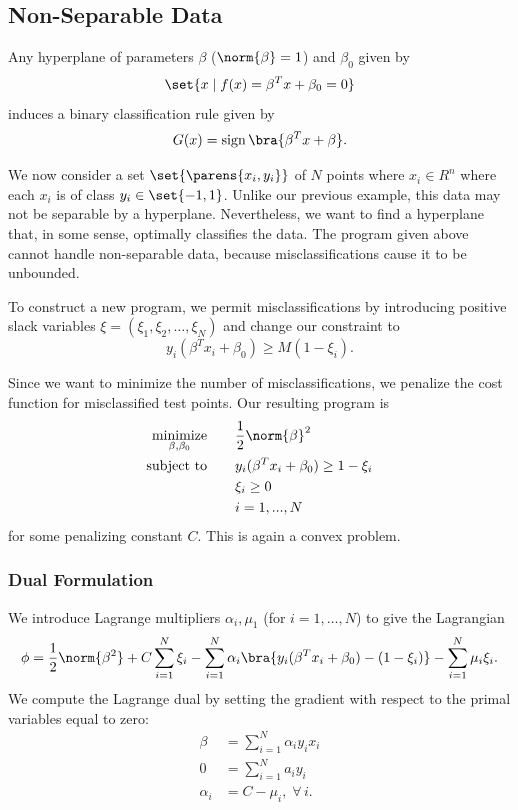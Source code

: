 \documentclass[10pt]{article}
\begin{document}
\subsection{Non-Separable Data} %
\label{sub:non_separable_data}

Any hyperplane of parameters $\beta$ ($\norm{\beta}=1$) and $\beta_{0}$ given by
\[
	\set{x \;|\; f(x)={\beta^{T}x+\beta_{0}}=0}	
\]
induces a binary classification rule given by
\[
	G(x)=\operatorname{sign}\bra{\beta^{T}x+\beta}. 
\]

We now consider a set $\set{\parens{x_{i},y_{i}}}$ of $N$ points where $x_{i}\in R^{n}$ where each $x_{i}$ is of class $y_{i}\in\set{-1,1}$. Unlike our previous example, this data may not be separable by a hyperplane. Nevertheless, we want to find a hyperplane that, in some sense, optimally classifies the data. The program given above cannot handle non-separable data, because misclassifications cause it to be unbounded. 

To construct a new program, we permit misclassifications by introducing positive slack variables $\xi=(\xi_{1},\xi_{2},\ldots,\xi_{N})$ and change our constraint to
\[
	y_{i}(\beta^{T}x_{i}+\beta_{0})\geq M(1-\xi_{i}).
\]

Since we want to minimize the number of misclassifications, we penalize the cost function for misclassified test points. Our resulting program is
\begin{align*}
	\operatorname*{minimize}_{\beta,\beta_{0}}\qquad & \frac{1}{2}\norm{\beta}^{2} \\
	\text{subject to}\qquad & 	y_{i}(\beta^{T}x_{i}+\beta_{0})\geq 1-\xi_{i} \\
	&\xi_{i}\geq 0\\
	&i=1,...,N
\end{align*}
for some penalizing constant $C$. This is again a convex problem. 

\subsubsection{Dual Formulation} %
\label{ssub:dual_formulation}

We introduce Lagrange multipliers $\alpha_{i}, \mu_{1}$ (for $i=1,\ldots,N$) to give the Lagrangian 
\[
	\phi=
		\frac{1}{2}\norm{\beta^{2}}
		+C\sum_{i=1}^{N}\xi_{i}
		-\sum_{i=1}^{N}\alpha_{i}
			\bra{	y_{i}(\beta^{T}x_{i}+\beta_{0})-(1-\xi_{i})}
		-\sum_{i=1}^{N}\mu_{i}\xi_{i}. 
\]
We compute the Lagrange dual by setting the gradient with respect to the primal variables equal to zero:
\begin{align}
	\beta&=\sum_{i=1}^{N}\alpha_{i}y_{i}x_{i} \label{eq:dual_con_3}\\
	0&=\sum_{i=1}^{N}a_{i}y_{i} \label{eq:dual_con_1}\\
	\alpha_{i}&=C-\mu_{i}, \;\forall\, i.\label{eq:dual_con_2}
\end{align}
\end{document}
